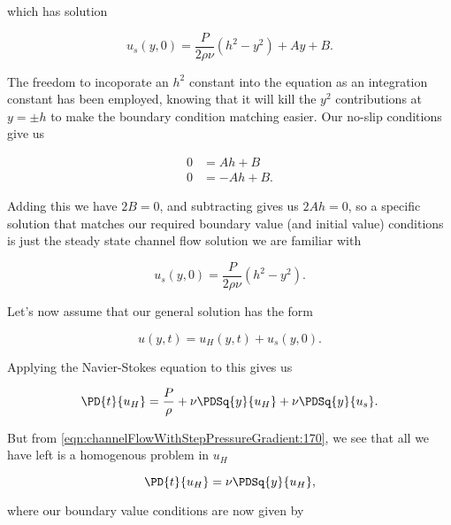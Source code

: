 which has solution

\begin{equation}\label{eqn:channelFlowWithStepPressureGradient:190}
u_s(y, 0) = \frac{P}{2 \rho \nu} \left( h^2 - y^2 \right) + A y + B.
\end{equation}

The freedom to incoporate an $h^2$ constant into the equation as an integration constant has been employed, knowing that it will kill the $y^2$ contributions at $y = \pm h$ to make the boundary condition matching easier.  Our no-slip conditions give us

\begin{align}\label{eqn:channelFlowWithStepPressureGradient:210}
0 &= A h + B \\
0 &= -A h + B.
\end{align}

Adding this we have $2 B = 0$, and subtracting gives us $2 A h = 0$, so a specific solution that matches our required boundary value (and initial value) conditions is just the steady state channel flow solution we are familiar with

\begin{equation}\label{eqn:channelFlowWithStepPressureGradient:230}
u_s(y, 0) = \frac{P}{2 \rho \nu} \left( h^2 - y^2 \right).
\end{equation}

Let's now assume that our general solution has the form

\begin{equation}\label{eqn:channelFlowWithStepPressureGradient:250}
u(y, t) = u_H(y, t) + u_s(y, 0).
\end{equation}

Applying the Navier-Stokes equation to this gives us

\begin{equation}\label{eqn:channelFlowWithStepPressureGradient:270}
\PD{t}{u_H} = \frac{P}{\rho} + \nu \PDSq{y}{u_H} + \nu \PDSq{y}{u_s}.
\end{equation}

But from \ref{eqn:channelFlowWithStepPressureGradient:170}, we see that all we have left is a homogenous problem in $u_H$

\begin{equation}\label{eqn:channelFlowWithStepPressureGradient:270b}
\PD{t}{u_H} = \nu \PDSq{y}{u_H},
\end{equation}

where our boundary value conditions are now given by

